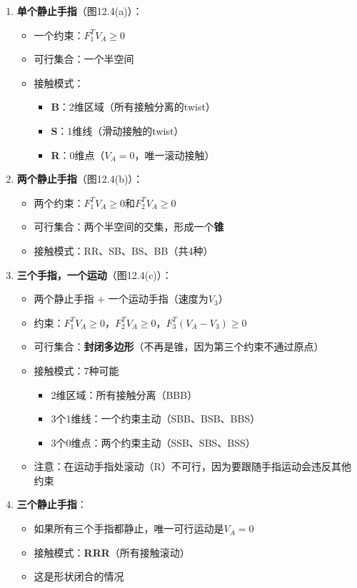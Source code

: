 \documentclass[12pt,a4paper]{article}
\begin{document}
\begin{enumerate}
\item \textbf{单个静止手指}（图12.4(a)）：
  \begin{itemize}
  \item 一个约束：$F_1^T V_A \geq 0$
  \item 可行集合：一个半空间
  \item 接触模式：
    \begin{itemize}
    \item \textbf{B}：2维区域（所有接触分离的twist）
    \item \textbf{S}：1维线（滑动接触的twist）
    \item \textbf{R}：0维点（$V_A = 0$，唯一滚动接触）
    \end{itemize}
  \end{itemize}

\item \textbf{两个静止手指}（图12.4(b)）：
  \begin{itemize}
  \item 两个约束：$F_1^T V_A \geq 0$和$F_2^T V_A \geq 0$
  \item 可行集合：两个半空间的交集，形成一个\textbf{锥}
  \item 接触模式：RR、SB、BS、BB（共4种）
  \end{itemize}

\item \textbf{三个手指，一个运动}（图12.4(c)）：
  \begin{itemize}
  \item 两个静止手指 + 一个运动手指（速度为$V_3$）
  \item 约束：$F_1^T V_A \geq 0$，$F_2^T V_A \geq 0$，$F_3^T (V_A - V_3) \geq 0$
  \item 可行集合：\textbf{封闭多边形}（不再是锥，因为第三个约束不通过原点）
  \item 接触模式：7种可能
    \begin{itemize}
    \item 2维区域：所有接触分离（BBB）
    \item 3个1维线：一个约束主动（SBB、BSB、BBS）
    \item 3个0维点：两个约束主动（SSB、SBS、BSS）
    \end{itemize}
  \item 注意：在运动手指处滚动（R）不可行，因为要跟随手指运动会违反其他约束
  \end{itemize}

\item \textbf{三个静止手指}：
  \begin{itemize}
  \item 如果所有三个手指都静止，唯一可行运动是$V_A = 0$
  \item 接触模式：\textbf{RRR}（所有接触滚动）
  \item 这是形状闭合的情况
  \end{itemize}
\end{enumerate}
\end{document}
